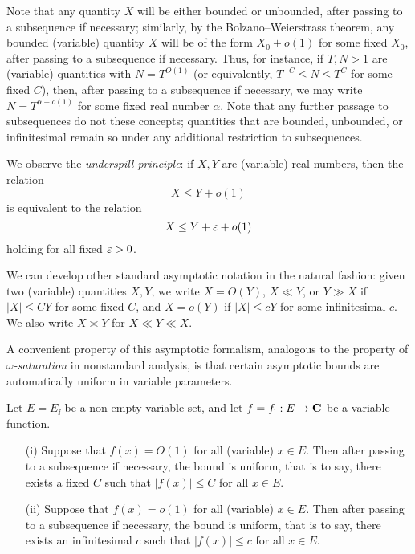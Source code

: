 Note that any quantity $X$ will be either bounded or unbounded, after passing to a subsequence if necessary; similarly, by the Bolzano--Weierstrass theorem, any bounded (variable) quantity $X$ will be of the form $X_0+o(1)$ for some fixed $X_0$, after passing to a subsequence if necessary.  Thus, for instance, if $T, N > 1$ are (variable) quantities with $N = T^{O(1)}$ (or equivalently, $T^{-C} \leq N \leq T^C$ for some fixed $C$), then, after passing to a subsequence if necessary, we may write $N = T^{\alpha+o(1)}$ for some fixed real number $\alpha$.  Note that any further passage to subsequences do not these concepts; quantities that are bounded, unbounded, or infinitesimal remain so under any additional restriction to subsequences.

We observe the \emph{underspill principle}: if $X,Y$ are (variable) real numbers, then the relation
$$ X \leq Y + o(1)$$
is equivalent to the relation
$$ X \leq Y + \varepsilon + o(1)$$
holding for all fixed $\varepsilon>0$.

We can develop other standard asymptotic notation in the natural fashion: given two (variable) quantities $X,Y$, we write $X = O(Y)$, $X \ll Y$, or $Y \gg X$ if $|X| \leq CY$ for some fixed $C$, and $X = o(Y)$ if $|X| \leq cY$ for some infinitesimal $c$.  We also write $X \asymp Y$ for $X \ll Y \ll X$.

A convenient property of this asymptotic formalism, analogous to the property of \emph{$\omega$-saturation} in nonstandard analysis, is that certain asymptotic bounds are automatically uniform in variable parameters.

\begin{proposition}\label{auto}  Let $E = E_{\ii}$ be a non-empty variable set, and let $f = f_{{\mathrm{i}}}: E \to \mathbf{C}$ be a variable function.  \begin{itemize}
    \item[(i)] Suppose that $f(x)=O(1)$ for all (variable) $x \in E$.  Then after passing to a subsequence if necessary, the bound is uniform, that is to say, there exists a fixed $C$ such that $|f(x)| \leq C$ for all $x \in E$.
    \item[(ii)] Suppose that $f(x)=o(1)$ for all (variable) $x \in E$.  Then after passing to a subsequence if necessary, the bound is uniform, that is to say, there exists an infinitesimal $c$ such that $|f(x)| \leq c$ for all $x \in E$.
\end{itemize}
\end{proposition}

